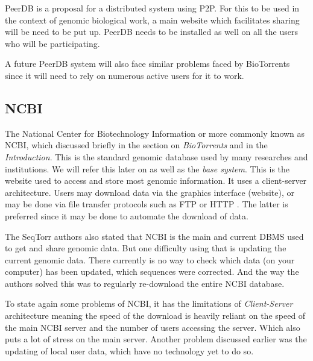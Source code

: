 \documentclass[acmsmall]{acmart}
\begin{document}
PeerDB is a proposal for a distributed system using P2P. For this to be used in the context of genomic biological work, a main website which facilitates sharing will be need to be put up. PeerDB needs to be installed as well on all the users who will be participating.

A future PeerDB system will also face similar problems faced by BioTorrents since it will need to rely on numerous active users for it to work.

\subsection{NCBI}
The National Center for Biotechnology Information or more commonly known as NCBI, which discussed briefly in the section on \textit{BioTorrents} and in the \textit{Introduction}. This is the standard genomic database used by many researches and institutions. We will refer this later on as well as the \textit{base system}. This is the website used to access and store most genomic information\cite{campbell}. It uses a client-server architecture. Users may download data via the graphics interface (website), or may be done via file transfer protocols such as FTP or HTTP \cite{biotorrents}. The latter is preferred since it may be done to automate the download of data.

The SeqTorr authors\cite{seqtorr} also stated that NCBI is the main and current DBMS used to get and share genomic data. But one difficulty using that is updating the current genomic data. There currently is no way to check which data (on your computer) has been updated, which sequences were corrected. And the way the authors solved this was to regularly re-download the entire NCBI database.

To state again some problems of NCBI, it has the limitations of \textit{Client-Server} architecture meaning the speed of the download is heavily reliant on the speed of the main NCBI server and the number of users accessing the server. Which also puts a lot of stress on the main server. Another problem discussed earlier was the updating of local user data, which have no technology yet to do so.

\end{document}
